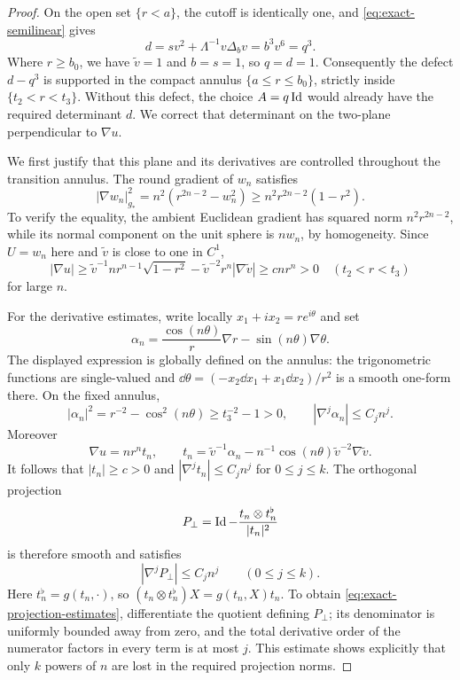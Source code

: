 \begin{proof}
On the open set \(\{r<a\}\), the cutoff is identically one, and
\eqref{eq:exact-semilinear} gives
\[
 d=sv^2+\Lambda^{-1}v\Delta_bv=b^3v^6=q^3.
\]
Where \(r\ge b_0\), we have \(\widetilde v=1\) and \(b=s=1\),
so \(q=d=1\).  Consequently the defect \(d-q^3\) is supported in
the compact annulus \(\{a\le r\le b_0\}\), strictly inside
\(\{t_2<r<t_3\}\).  Without this defect, the choice \(A=q\operatorname{Id}\)
would already have the required determinant \(d\).  We correct that
determinant on the two-plane perpendicular to \(\nabla u\).

We first justify that this plane and its derivatives are controlled
throughout the transition annulus.  The round gradient of \(w_n\)
satisfies
\begin{equation}
 |\nabla w_n|_{g_*}^2
 =n^2(r^{2n-2}-w_n^2)
 \ge n^2r^{2n-2}(1-r^2).
 \label{eq:exact-annular-gradient}
\end{equation}
To verify the equality, the ambient Euclidean gradient has squared
norm \(n^2r^{2n-2}\), while its normal component on the unit sphere
is \(nw_n\), by homogeneity.  Since \(U=w_n\) here and
\(\widetilde v\) is close to one in \(C^1\),
\[
 |\nabla u|
 \ge \widetilde v^{-1}nr^{n-1}\sqrt{1-r^2}
       -\widetilde v^{-2}r^n|\nabla\widetilde v|
 \ge c n r^n>0
 \quad(t_2<r<t_3)
\]
for large \(n\).

For the derivative estimates, write locally
\(x_1+ix_2=re^{i\theta}\) and set
\[
 \alpha_n=\frac{\cos(n\theta)}r\nabla r
             -\sin(n\theta)\nabla\theta.
\]
The displayed expression is globally defined on the annulus: the
trigonometric functions are single-valued and
\(\dd\theta=(-x_2\dd x_1+x_1\dd x_2)/r^2\) is a smooth one-form
there.  On the fixed annulus,
\[
 |\alpha_n|^2=r^{-2}-\cos^2(n\theta)\ge t_3^{-2}-1>0,
 \qquad |\nabla^j\alpha_n|\le C_j n^j.
\]
Moreover
\[
 \nabla u=nr^n t_n,\qquad
 t_n=\widetilde v^{-1}\alpha_n
      -n^{-1}\cos(n\theta)\widetilde v^{-2}\nabla\widetilde v.
\]
It follows that \(|t_n|\ge c>0\) and
\(|\nabla^jt_n|\le C_jn^j\) for \(0\le j\le k\).  The
orthogonal projection
\[
 P_\perp=\operatorname{Id}-\frac{t_n\otimes t_n^\flat}{|t_n|^2}
\]
is therefore smooth and satisfies
\begin{equation}
 |\nabla^jP_\perp|\le C_jn^j\qquad(0\le j\le k).
 \label{eq:exact-projection-estimates}
\end{equation}
Here \(t_n^\flat=g(t_n,\cdot)\), so
\((t_n\otimes t_n^\flat)X=g(t_n,X)t_n\).
To obtain \eqref{eq:exact-projection-estimates}, differentiate the
quotient defining \(P_\perp\); its denominator is uniformly bounded
away from zero, and the total derivative order of the numerator factors
in every term is at most \(j\).  This estimate shows explicitly that
only \(k\) powers of \(n\) are lost in the required projection norms.


\end{proof}
